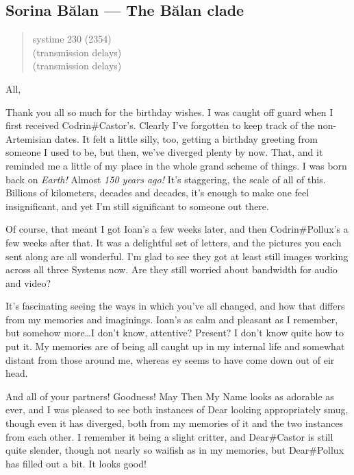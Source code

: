 \hypertarget{sorina-bux103lan-the-bux103lan-clade}{%
\subsection{Sorina Bălan — The Bălan clade}\label{sorina-bux103lan-the-bux103lan-clade}}

\begin{quote}
systime 230 (2354)\\
(transmission delays)\\
(transmission delays)
\end{quote}

All,

Thank you all so much for the birthday wishes. I was caught off guard when I first received Codrin\#Castor's. Clearly I've forgotten to keep track of the non-Artemisian dates. It felt a little silly, too, getting a birthday greeting from someone I used to be, but then, we've diverged plenty by now. That, and it reminded me a little of my place in the whole grand scheme of things. I was born back on \emph{Earth!} Almost \emph{150 years ago!} It's staggering, the scale of all of this. Billions of kilometers, decades and decades, it's enough to make one feel insignificant, and yet I'm still significant to someone out there.

Of course, that meant I got Ioan's a few weeks later, and then Codrin\#Pollux's a few weeks after that. It was a delightful set of letters, and the pictures you each sent along are all wonderful. I'm glad to see they got at least still images working across all three Systems now. Are they still worried about bandwidth for audio and video?

It's fascinating seeing the ways in which you've all changed, and how that differs from my memories and imaginings. Ioan's as calm and pleasant as I remember, but somehow more\ldots I don't know, attentive? Present? I don't know quite how to put it. My memories are of being all caught up in my internal life and somewhat distant from those around me, whereas ey seems to have come down out of eir head.

And all of your partners! Goodness! May Then My Name looks as adorable as ever, and I was pleased to see both instances of Dear looking appropriately smug, though even it has diverged, both from my memories of it and the two instances from each other. I remember it being a slight critter, and Dear\#Castor is still quite slender, though not nearly so waifish as in my memories, but Dear\#Pollux has filled out a bit. It looks good!

